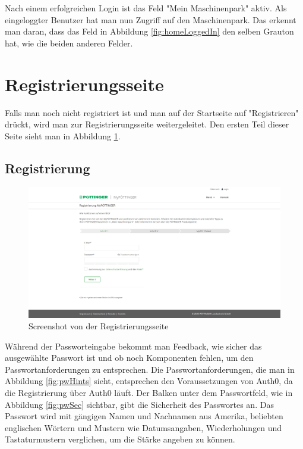 Nach einem erfolgreichen Login ist das Feld "Mein Maschinenpark" aktiv. Als eingeloggter Benutzer hat man nun Zugriff auf den Maschinenpark. Das erkennt man daran, dass das Feld in Abbildung \ref{fig:homeLoggedIn} den selben Grauton hat, wie die beiden anderen Felder. 

\section{Registrierungsseite}

Falls man noch nicht registriert ist und man auf der Startseite auf "Registrieren" drückt, wird man zur Registrierungsseite weitergeleitet. Den ersten Teil dieser Seite sieht man in Abbildung \ref{fig:register}.

\subsection{Registrierung}
\begin{figure}[H]
	\centerline{
		\includegraphics[width=1\textwidth, frame]{./grafiken/erm_register.png}
	}
	\vskip0pt
	\caption{Screenshot von der Registrierungsseite} \label{fig:register}
\end{figure}

Während der Passworteingabe bekommt man Feedback, wie sicher das ausgewählte Passwort ist und ob noch Komponenten fehlen, um den Passwortanforderungen zu entsprechen. Die Passwortanforderungen, die man in Abbildung \ref{fig:pwHints} sieht, entsprechen den Voraussetzungen von Auth0, da die Registrierung über Auth0 läuft. Der Balken unter dem Passwortfeld, wie in Abbildung \ref{fig:pwSec} sichtbar, gibt die Sicherheit des Passwortes an. Das Passwort wird mit gängigen Namen und Nachnamen aus Amerika, beliebten englischen Wörtern und Mustern wie Datumsangaben, Wiederholungen und Tastaturmustern verglichen, um die Stärke angeben zu können.

